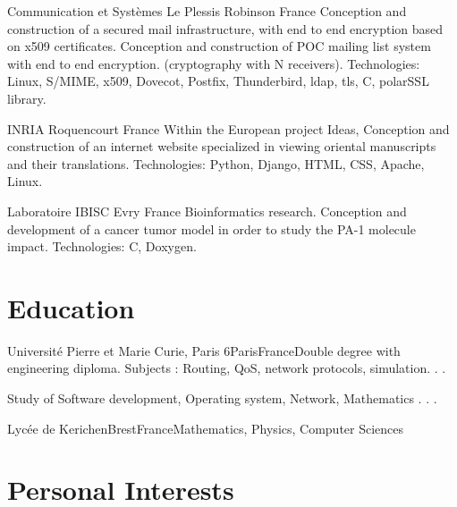 \documentclass[10pt,a4paper]{moderncv}
\begin{document}
              {Communication et Systèmes}
              {Le Plessis Robinson}
              {France}
              {Conception and construction of a secured mail infrastructure, with end to end encryption
              based on x509 certificates. Conception and construction of POC mailing list system with end to end encryption. 
              (cryptography with N receivers).
              \newline Technologies: Linux, S/MIME, x509, Dovecot, Postfix, Thunderbird, ldap, tls, C, polarSSL library.
              }

              {INRIA}
              {Roquencourt}
              {France}
              {Within the European project Ideas, Conception and construction of an
               internet website specialized in viewing oriental manuscripts and their
               translations.
                 \newline Technologies: Python, Django, HTML, CSS, Apache, Linux.
              }

              {Laboratoire IBISC}
              {Evry}
              {France}
              {Bioinformatics research. Conception
               and development of a cancer tumor model in order to
               study the PA-1 molecule impact.
                \newline Technologies: C, Doxygen.
              }

\section{Education}
{Université Pierre et Marie Curie, Paris 6}{Paris}{France}{Double degree with engineering diploma. Subjects : Routing, QoS, network protocols, simulation. . .}

{Study of Software development, Operating system, Network, Mathematics . . .}

{Lycée de Kerichen}{Brest}{France}{Mathematics, Physics, Computer Sciences}

\section{Personal Interests}
\end{document}
